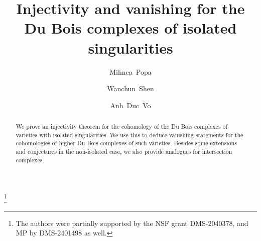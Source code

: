 \documentclass[11pt]{amsart}
\theoremstyle{definition}
\theoremstyle{plain}
\begin{document}
\title[Du Bois complexes of isolated singularities]{Injectivity and vanishing for the Du Bois complexes of isolated singularities}



\author[M.~Popa]{Mihnea~Popa}
\address{Department of Mathematics, Harvard University, 
1 Oxford Street, Cambridge, MA 02138, USA} 

\author[W.~Shen]{Wanchun~Shen}
\address{Department of Mathematics, Harvard University, 
1 Oxford Street, Cambridge, MA 02138, USA} 

\author[A. D.~Vo]{Anh~Duc~Vo}
\address{Department of Mathematics, Harvard University, 
1 Oxford Street, Cambridge, MA 02138, USA} 


\thanks{The authors were partially supported by the NSF grant DMS-2040378, and MP by DMS-2401498 as well.}

\subjclass[2020]{}

\begin{abstract}
We prove an injectivity theorem for the cohomology of the Du Bois complexes of varieties with isolated singularities. We use this to deduce vanishing statements for the cohomologies of higher Du Bois complexes of such varieties. Besides some extensions and conjectures in the non-isolated case, we also provide analogues for 
intersection complexes.
\end{abstract}



\maketitle

\makeatletter
\newcommand\@dotsep{4.5}
\def\@tocline#1#2#3#4#5#6#7{\relax
  \ifnum #1>\c@tocdepth %
  \else
    \par \addpenalty\@secpenalty\addvspace{#2}%
    \begingroup \hyphenpenalty\@M
    \@ifempty{#4}{%
      \@tempdima\csname r@tocindent\number#1\endcsname\relax
    }{%
      \@tempdima#4\relax
    }%
    \parindent\z@ \leftskip#3\relax
    \advance\leftskip\@tempdima\relax
    \rightskip\@pnumwidth plus1em \parfillskip-\@pnumwidth
    #5\leavevmode\hskip-\@tempdima #6\relax
    \leaders\hbox{$\m@th
      \mkern \@dotsep mu\hbox{.}\mkern \@dotsep mu$}\hfill
    \hbox to\@pnumwidth{\@tocpagenum{#7}}\par
    \nobreak
    \endgroup
  \fi}
\def\l@section{\@tocline{1}{0pt}{1pc}{}{\bfseries}}
\def\l@subsection{\@tocline{2}{0pt}{25pt}{5pc}{}}
\makeatother
\end{document}
